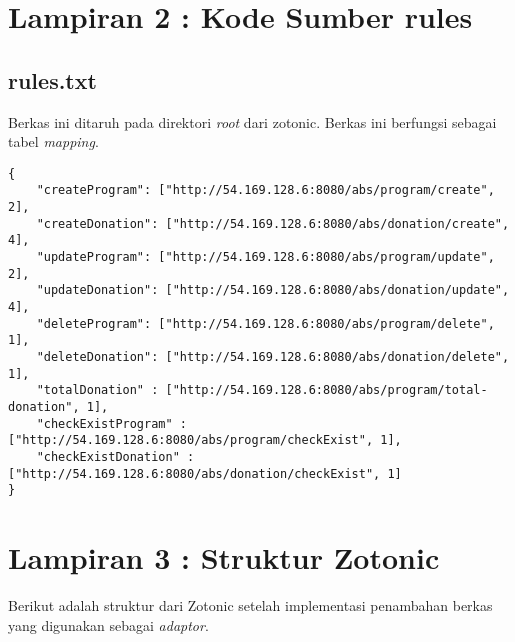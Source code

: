 \chapter*{Lampiran 2 : Kode Sumber rules}
\section*{rules.txt}
Berkas ini ditaruh pada direktori \textit{root} dari zotonic. Berkas ini berfungsi sebagai tabel \textit{mapping}.
\begin{lstlisting}[caption={Berkas rules.txt},label={lst:excomp}]
{
	"createProgram": ["http://54.169.128.6:8080/abs/program/create", 2],
	"createDonation": ["http://54.169.128.6:8080/abs/donation/create", 4],
	"updateProgram": ["http://54.169.128.6:8080/abs/program/update", 2],
	"updateDonation": ["http://54.169.128.6:8080/abs/donation/update", 4],
	"deleteProgram": ["http://54.169.128.6:8080/abs/program/delete", 1],
	"deleteDonation": ["http://54.169.128.6:8080/abs/donation/delete", 1],
	"totalDonation" : ["http://54.169.128.6:8080/abs/program/total-donation", 1],
	"checkExistProgram" : ["http://54.169.128.6:8080/abs/program/checkExist", 1],
	"checkExistDonation" : ["http://54.169.128.6:8080/abs/donation/checkExist", 1]
}
\end{lstlisting}

\chapter*{Lampiran 3 : Struktur Zotonic}
Berikut adalah struktur dari Zotonic setelah implementasi penambahan berkas yang digunakan sebagai \textit{adaptor}.


